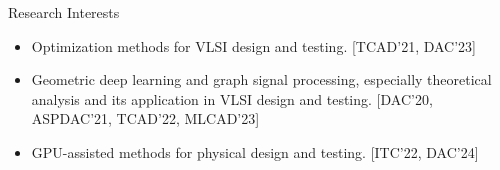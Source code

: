 
\begin{rSection}{Research Interests}
    
\begin{itemize}
    \item Optimization methods for VLSI design and testing. {[TCAD'21, DAC'23]}
    \item Geometric deep learning and graph signal processing, especially theoretical analysis and its application in VLSI design and testing. {[DAC'20, ASPDAC'21, TCAD'22, MLCAD'23]}
    \item GPU-assisted methods for physical design and testing. {[ITC'22, DAC'24]}
\end{itemize}
\end{rSection}




